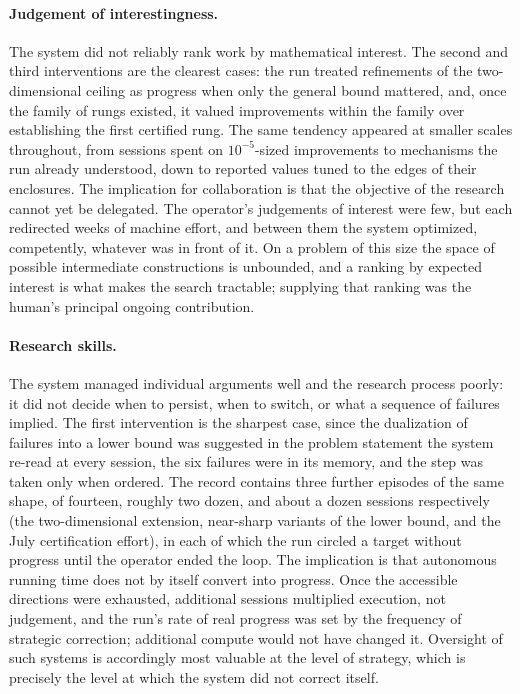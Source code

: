 \paragraph{Judgement of interestingness.}
The system did not reliably rank work by mathematical interest. The second
and third interventions are the clearest cases: the run treated refinements
of the two-dimensional ceiling as progress when only the general bound
mattered, and, once the family of rungs existed, it valued improvements
within the family over establishing the first certified rung. The same
tendency appeared at smaller scales throughout, from sessions spent on
$10^{-5}$-sized improvements to mechanisms the run already understood, down
to reported values tuned to the edges of their enclosures. The implication
for collaboration is that the objective of the research cannot yet be
delegated. The operator's judgements of interest were few, but each
redirected weeks of machine effort, and between them the system optimized,
competently, whatever was in front of it. On a problem of this size the
space of possible intermediate constructions is unbounded, and a ranking by
expected interest is what makes the search tractable; supplying that
ranking was the human's principal ongoing contribution.

\paragraph{Research skills.}
The system managed individual arguments well and the research process
poorly: it did not decide when to persist, when to switch, or what a
sequence of failures implied. The first intervention is the sharpest case,
since the dualization of failures into a lower bound was suggested in the
problem statement the system re-read at every session, the six failures
were in its memory, and the step was taken only when ordered. The record
contains three further episodes of the same shape, of fourteen, roughly two
dozen, and about a dozen sessions respectively (the two-dimensional
extension, near-sharp variants of the lower bound, and the July
certification effort), in each of which the run circled a target without
progress until the operator ended the loop. The implication is that
autonomous running time does not by itself convert into progress. Once the
accessible directions were exhausted, additional sessions multiplied
execution, not judgement, and the run's rate of real progress was set by
the frequency of strategic correction; additional compute would not have
changed it. Oversight of such systems is accordingly most valuable at the
level of strategy, which is precisely the level at which the system did not
correct itself.

